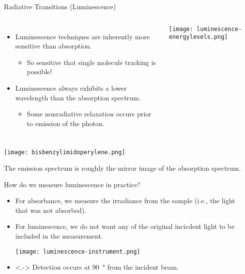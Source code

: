 \documentclass[notes=only]{beamer}
\begin{document}
	\begin{frame}[allowframebreaks]{Radiative Transitions (Luminescence)}
	\begin{columns}
	\begin{itemize}
		\item Luminescence techniques are inherently more sensitive than absorption.
			\begin{itemize}
				\item So sensitive that \alert{single molecule}
					tracking is possible!
			\end{itemize}
		\item Luminescence \alert{always} exhibits a \alert{lower}
			wavelength than the absorption spectrum.
			\begin{itemize}
				\item Some nonradiative relaxation occurs prior
					to emission of the photon.
			\end{itemize}
	\end{itemize}
		\texttt{[image: luminescence-energylevels.png]}
	\end{columns}

	\framebreak

	\begin{center}
		\texttt{[image: bisbenzylimidoperylene.png]}
	\end{center}
	
	The emission spectrum is roughly the mirror image of the absorption
	spectrum.
\end{frame}

\begin{frame}{How do we measure luminescence in practice?}
	\begin{itemize}[<+->]
		\item For absorbance, we measure the irradiance from the sample
			(i.e., the light that was \alert{not} absorbed).
		\item For luminescence, we \alert{do not} want any of the
			original incicdent light to be included in the
			measurement.
			\begin{center}
				\texttt{[image: luminescence-instrument.png]}
			\end{center}
		\item<.-> Detection occurs at \alert{\SI{90}{\degree}} from the
			incident beam.
	\end{itemize}
\end{frame}
\end{document}
